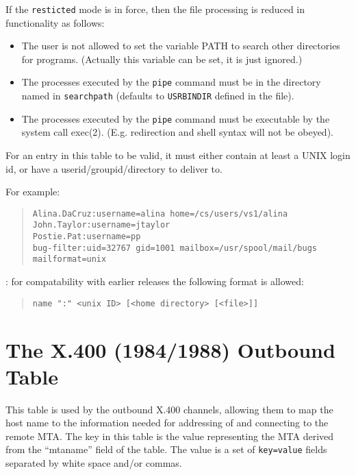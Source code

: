 If the
\verb|resticted| mode is in force, then the
 file processing is reduced in functionality as
follows:
\begin{itemize}
\item	The user is not allowed to set the variable PATH to search
other directories for programs. (Actually this variable can be set, it
is just ignored.)
\item	The processes executed by the \verb|pipe| command must be in
the directory named in \verb|searchpath| (defaults to
\verb|USRBINDIR| defined in the  file).
\item	The processes executed by the \verb|pipe| command must be
executable by the system call \man exec(2). (E.g. redirection and
shell syntax will not be obeyed).
\end{itemize}

For an entry in this table to be valid, it must either contain at
least a UNIX login id, or have a userid/groupid/directory to deliver to.

For example:

\begin{quote}\small\begin{verbatim}
Alina.DaCruz:username=alina home=/cs/users/vs1/alina
John.Taylor:username=jtaylor
Postie.Pat:username=pp
bug-filter:uid=32767 gid=1001 mailbox=/usr/spool/mail/bugs mailformat=unix
\end{verbatim}\end{quote}

: for compatability with earlier releases the following format is
allowed:
\begin{quote}\begin{verbatim}
name ":" <unix ID> [<home directory> [<file>]]
\end{verbatim}\end{quote}

\section {The X.400 (1984/1988) Outbound Table}
\label{tab:X.400(84)out}

This table is used by the outbound X.400 channels, allowing them to map the
host name to the information needed for addressing of and connecting
to the remote MTA.  The key in this table is the
value representing the MTA derived from the ``mtaname'' field of the 
 table. The value is a set of \verb+key=value+ fields
separated by white space and/or commas.

